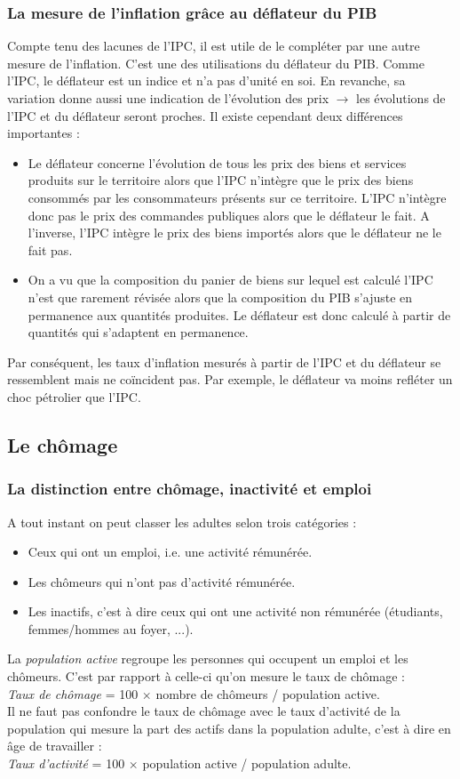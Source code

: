 \documentclass[10pt]{book}
\begin{document}
\subsubsection{La mesure de l'inflation grâce au déflateur du PIB}
Compte tenu des lacunes de l'IPC, il est utile de le compléter par une autre mesure de l'inflation. C'est une des utilisations du déflateur du PIB. Comme l'IPC, le déflateur est un indice et n'a pas d'unité en soi. En revanche, sa variation donne aussi une indication de l'évolution des prix $\rightarrow$ les évolutions de l'IPC et du déflateur seront proches. Il existe cependant deux différences importantes : 
\begin{itemize}
  \item Le déflateur concerne l'évolution de tous les prix des biens et services produits sur le territoire alors que l'IPC n'intègre que le prix des biens consommés par les consommateurs présents sur ce territoire. L'IPC n'intègre donc pas le prix des commandes publiques alors que le déflateur le fait. A l'inverse, l'IPC intègre le prix des biens importés alors que le déflateur ne le fait pas.
  \item On a vu que la composition du panier de biens sur lequel est calculé l'IPC n'est que rarement révisée alors que la composition du PIB s'ajuste en permanence aux quantités produites. Le déflateur est donc calculé à partir de quantités qui s'adaptent en permanence.
\end{itemize}
Par conséquent, les taux d'inflation mesurés à partir de l'IPC et du déflateur se ressemblent mais ne coïncident pas. Par exemple, le déflateur va moins refléter un choc pétrolier que l'IPC.

\subsection{Le chômage}
\subsubsection{La distinction entre chômage, inactivité et emploi}
A tout instant on peut classer les adultes selon trois catégories : 
\begin{itemize}
  \item Ceux qui ont un emploi, i.e. une activité rémunérée.
  \item Les chômeurs qui n'ont pas d'activité rémunérée.
  \item Les inactifs, c'est à dire ceux qui ont une activité non rémunérée (étudiants, femmes/hommes au foyer, ...).
\end{itemize}
La \textit{population active} regroupe les personnes qui occupent un emploi et les chômeurs. C'est par rapport à celle-ci qu'on mesure le taux de chômage : \\
\textit{Taux de chômage} = 100 $\times$ nombre de chômeurs / population active. \\
Il ne faut pas confondre le taux de chômage avec le taux d'activité de la population qui mesure la part des actifs dans la population adulte, c'est à dire en âge de travailler : \\
\textit{Taux d'activité} = 100 $\times$ population active / population adulte.
\end{document}
